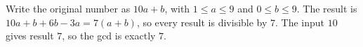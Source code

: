Write the original number as $10a+b$, with $1\le a\le9$ and $0\le b\le9$. The result is $10a+b+6b-3a=7(a+b)$, so every result is divisible by $7$. The input $10$ gives result $7$, so the gcd is exactly $\boxed7$.
